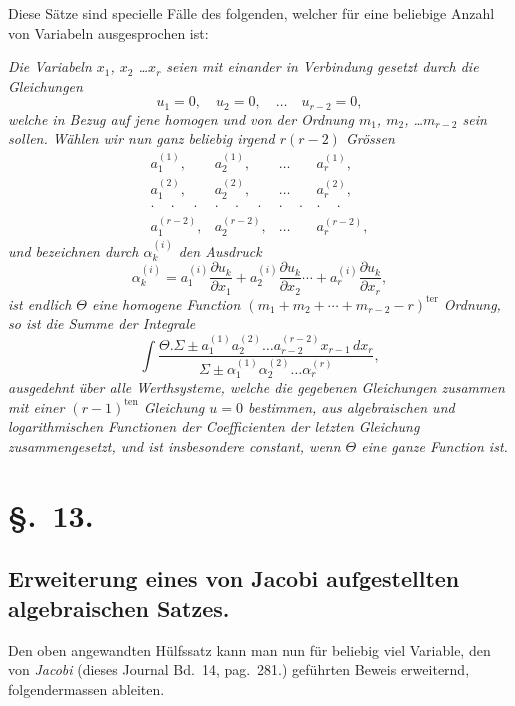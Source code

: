 \documentclass{article}
\begin{document}

Diese Sätze sind specielle Fälle des folgenden, welcher für eine beliebige Anzahl von Variabeln ausgesprochen ist:

\emph{Die Variabeln $x_{1}$, $x_{2}$ \ldots $x_{r}$ seien mit einander in Verbindung gesetzt durch die Gleichungen}
\[
u_{1}=0, \quad u_{2}=0, \quad \ldots \quad u_{r-2}=0,
\]
\emph{welche in Bezug auf jene homogen und von der Ordnung $m_{1}$, $m_{2}$, \ldots $m_{r-2}$ sein sollen. Wählen wir nun ganz beliebig irgend $r(r-2)$ Grössen}
\[
\begin{matrix}
a_{1}^{(1)}, & a_{2}^{(1)}, & \ldots & a_{r}^{(1)},\\
a_{1}^{(2)}, & a_{2}^{(2)}, & \ldots & a_{r}^{(2)},\\
\cdot\quad\cdot\quad\cdot & \cdot\quad\cdot\quad\cdot & \cdot\quad\cdot & \cdot\quad\cdot\\
a_{1}^{(r-2)}, & a_{2}^{(r-2)}, & \ldots & a_{r}^{(r-2)},
\end{matrix}
\]
\emph{und bezeichnen durch $\alpha_{k}^{(i)}$ den Ausdruck}
\[
\alpha_{k}^{(i)} = a_{1}^{(i)}\frac{\partial u_{k}}{\partial x_{1}} + a_{2}^{(i)}\frac{\partial u_{k}}{\partial x_{2}}\cdots + a_{r}^{(i)}\frac{\partial u_{k}}{\partial x_{r}},
\]
\emph{ist endlich $\Theta$ eine homogene Function $(m_{1}+m_{2}+\cdots+m_{r-2}-r)^{\text{ter}}$ Ordnung, so ist die Summe der Integrale}
\[
\int \frac{\Theta.\Sigma\pm a_{1}^{(1)}a_{2}^{(2)}\ldots a_{r-2}^{(r-2)}x_{r-1}\,dx_{r}}{\Sigma\pm\alpha_{1}^{(1)}\alpha_{2}^{(2)}\ldots\alpha_{r}^{(r)}},
\]
\emph{ausgedehnt über alle Werthsysteme, welche die gegebenen Gleichungen zusammen mit einer $(r-1)^{\text{ten}}$ Gleichung $u=0$ bestimmen, aus algebraischen und logarithmischen Functionen der Coefficienten der letzten Gleichung zusammengesetzt, und ist insbesondere constant, wenn $\Theta$ eine ganze Function ist.}

\section*{§.~13.}

\subsection*{Erweiterung eines von Jacobi aufgestellten algebraischen Satzes.}

Den oben angewandten Hülfssatz kann man nun für beliebig viel Variable, den von \emph{Jacobi} (dieses Journal Bd.\ 14, pag.\ 281.) geführten Beweis erweiternd, folgendermassen ableiten.
\end{document}
